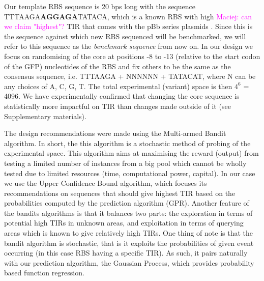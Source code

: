 \documentclass{article}
\newcommand{\mengyan}[1]{\textcolor{magenta}{#1}}
\begin{document}
Our template RBS sequence is 20 bps long with the sequence TTTAAGA\textbf{AGGAGA}TATACA, 
which is a known RBS with high \mengyan{Maciej: can we claim "highest"?} TIR that comes with the pBb series plasmids \cite{Lee2011}. 
Since this is the sequence against which new RBS sequenced will be benchmarked,
we will refer to this sequence as the \textit{benchmark sequence} from now on.
In our design we focus on randomising of the core at positions -8 to -13 (relative to the start codon of the GFP) nucleotides of the RBS and fix others to be the same as the consensus sequence, i.e. TTTAAGA + NNNNNN + TATACAT, where N can be any choices of A, C, G, T. 
The total experimental (variant) space is then $4^6$ = 4096.
We have experimentally confirmed that changing the core sequence is statistically more impactful on TIR than changes made outside of it (see Supplementary materials). 

The design recommendations were made using the Multi-armed Bandit algorithm.
In short, the this algorithm is a stochastic method of probing of the experimental space. 
This algorithm aims at maximising the reward (output) from testing a limited number of instances from a big pool which cannot be wholly tested due to limited resources (time, computational power, capital). 
In our case we use the Upper Confidence Bound algorithm, which focuses its recommendations on sequences that should give highest TIR based on the probabilities computed by the prediction algorithm (GPR). 
Another feature of the bandits algorithms is that it balances two parts: the exploration in terms of potential high TIRs in unknown areas, and exploitation in terms of querying areas which is known to give relatively high TIRs.
One thing of note is that the bandit algorithm is stochastic, that is it exploits the probabilities of given event occurring (in this case RBS having a specific TIR). 
As such, it pairs naturally with our prediction algorithm, the Gaussian Process, which provides probability based function regression.
\end{document}
